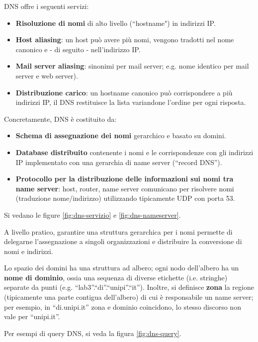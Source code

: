 \documentclass[11pt, italian, openany]{book}
\begin{document}
\begin{sloppypar}
\begin{itemize}[topsep=0pt, itemsep=0pt, parsep=0pt]
	DNS offre i seguenti servizi:
	\begin{itemize}[topsep=0pt, itemsep=0pt, parsep=0pt]
		\item \textbf{Risoluzione di nomi} di alto livello (``hostname") in indirizzi IP.
		\item \textbf{Host aliasing}: un host può avere più nomi, vengono tradotti nel nome canonico e - di seguito - nell'indirizzo IP.
		\item \textbf{Mail server aliasing}: sinonimi per mail server; e.g. nome identico per mail server e web server).
		\item \textbf{Distribuzione carico}: un hostname canonico può corrispondere a più indirizzi IP, il DNS restituisce la lista variandone l'ordine per
		ogni risposta.
	\end{itemize}

	Concretamente, DNS \`e costituito da:
	\begin{itemize}[topsep=0pt, itemsep=0pt, parsep=0pt]
		\item \textbf{Schema di assegnazione dei nomi} gerarchico e basato su domini.
		\item \textbf{Database distribuito} contenente i nomi e le corrispondenze con gli indirizzi IP implementato con una gerarchia di name server (``record
		DNS'').
		\item \textbf{Protocollo per la distribuzione delle informazioni sui nomi tra name server}: host, router, name server comunicano per risolvere nomi
		(traduzione nome/indirizzo) utilizzando tipicamente UDP con porta 53.
	\end{itemize}

	Si vedano le figure \ref{fig:dns-servizio} e \ref{fig:dns-nameserver}.

	A livello pratico, garantire una struttura gerarchica per i nomi permette di delegarne l'assegnazione a singoli organizzazioni e distribuire la conversione
	di nomi e indirizzi.

	Lo spazio dei domini ha una struttura ad albero; ogni nodo dell'albero ha un \textbf{nome di dominio}, ossia una sequenza di diverse
	etichette (i.e. stringhe) separate da punti (e.g. ``lab3''.``di''.``unipi''.``it''). Inoltre, si definisce \textbf{zona} la regione (tipicamente una parte
	contigua dell’albero) di cui \`e responsabile un name server; per esempio, in ``di.unipi.it'' zona e dominio coincidono, lo stesso discorso non vale per 
	``unipi.it''.

	Per esempi di query DNS, si veda la figura \ref{fig:dns-query}.


\end{itemize}
\end{sloppypar}
\end{document}
